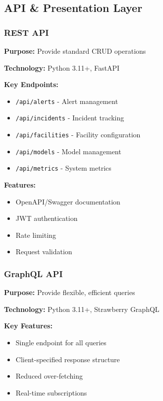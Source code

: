 \documentclass[12pt,a4paper]{article}
\begin{document}
\subsection{API \& Presentation Layer}

\subsubsection{REST API}

\textbf{Purpose:} Provide standard CRUD operations

\textbf{Technology:} Python 3.11+, FastAPI

\textbf{Key Endpoints:}
\begin{itemize}[leftmargin=1cm,itemsep=0pt]
    \item \texttt{/api/alerts} - Alert management
    \item \texttt{/api/incidents} - Incident tracking
    \item \texttt{/api/facilities} - Facility configuration
    \item \texttt{/api/models} - Model management
    \item \texttt{/api/metrics} - System metrics
\end{itemize}

\textbf{Features:}
\begin{itemize}[leftmargin=1cm,itemsep=0pt]
    \item OpenAPI/Swagger documentation
    \item JWT authentication
    \item Rate limiting
    \item Request validation
\end{itemize}

\subsubsection{GraphQL API}

\textbf{Purpose:} Provide flexible, efficient queries

\textbf{Technology:} Python 3.11+, Strawberry GraphQL

\textbf{Key Features:}
\begin{itemize}[leftmargin=1cm,itemsep=0pt]
    \item Single endpoint for all queries
    \item Client-specified response structure
    \item Reduced over-fetching
    \item Real-time subscriptions
\end{itemize}
\end{document}
